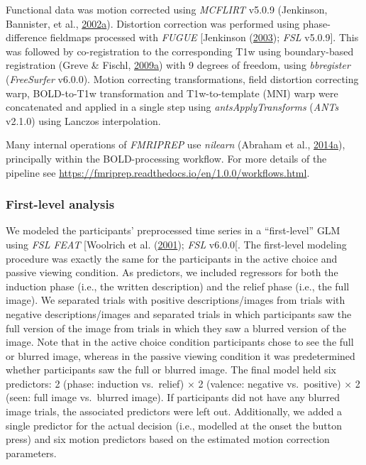 \documentclass[11pt,american,]{memoir} %
\begin{document}
Functional data was motion corrected using \emph{MCFLIRT} v5.0.9 (Jenkinson, Bannister, et al., \protect\hyperlink{ref-jenkinson2002improved}{2002}\protect\hyperlink{ref-jenkinson2002improved}{a}). Distortion correction was performed using phase-difference fieldmaps processed with \emph{FUGUE} {[}Jenkinson (\protect\hyperlink{ref-jenkinson2003fast}{2003}); \emph{FSL} v5.0.9{]}. This was followed by co-registration to the corresponding T1w using boundary-based registration (Greve \& Fischl, \protect\hyperlink{ref-greve2009accurate}{2009}\protect\hyperlink{ref-greve2009accurate}{a}) with 9 degrees of freedom, using \emph{bbregister} (\emph{FreeSurfer} v6.0.0). Motion correcting transformations, field distortion correcting warp, BOLD-to-T1w transformation and T1w-to-template (MNI) warp were concatenated and applied in a single step using \emph{antsApplyTransforms} (\emph{ANTs} v2.1.0) using Lanczos interpolation.

Many internal operations of \emph{FMRIPREP} use \emph{nilearn} (Abraham et al., \protect\hyperlink{ref-abraham2014machine}{2014}\protect\hyperlink{ref-abraham2014machine}{a}), principally within the BOLD-processing workflow. For more details of the pipeline see \url{https://fmriprep.readthedocs.io/en/1.0.0/workflows.html}.

\hypertarget{morbid-curiosity-methods-imaging-first-level-analysis}{%
\subsubsection{First-level analysis}\label{morbid-curiosity-methods-imaging-first-level-analysis}}

We modeled the participants' preprocessed time series in a ``first-level'' GLM using \emph{FSL FEAT} {[}Woolrich et al. (\protect\hyperlink{ref-woolrich2001temporal}{2001}); \emph{FSL} v6.0.0{[}. The first-level modeling procedure was exactly the same for the participants in the active choice and passive viewing condition. As predictors, we included regressors for both the induction phase (i.e., the written description) and the relief phase (i.e., the full image). We separated trials with positive descriptions/images from trials with negative descriptions/images and separated trials in which participants saw the full version of the image from trials in which they saw a blurred version of the image. Note that in the active choice condition participants chose to see the full or blurred image, whereas in the passive viewing condition it was predetermined whether participants saw the full or blurred image. The final model held six predictors: 2 (phase: induction vs.~relief) × 2 (valence: negative vs.~positive) × 2 (seen: full image vs.~blurred image). If participants did not have any blurred image trials, the associated predictors were left out. Additionally, we added a single predictor for the actual decision (i.e., modelled at the onset the button press) and six motion predictors based on the estimated motion correction parameters.
\end{document}
